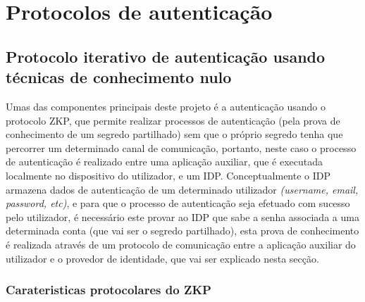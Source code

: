 \section{Protocolos de autenticação}

\subsection{Protocolo iterativo de autenticação usando técnicas de conhecimento nulo}

\quad Umas das componentes principais deste projeto é a autenticação usando o protocolo ZKP, que permite realizar processos de autenticação (pela prova de conhecimento de um segredo partilhado) sem que o próprio segredo tenha que percorrer um determinado canal de comunicação, portanto, neste caso o processo de autenticação é realizado entre uma aplicação auxiliar, que é executada localmente no dispositivo do utilizador, e um IDP. Conceptualmente o IDP armazena dados de autenticação de um determinado utilizador \textit{(username, email, password, etc)}, e para que o processo de autenticação seja efetuado com sucesso pelo utilizador, é necessário este provar ao IDP que sabe a senha associada a uma determinada conta (que vai ser o segredo partilhado), esta prova de conhecimento é realizada através de um protocolo de comunicação entre a aplicação auxiliar do utilizador e o provedor de identidade, que vai ser explicado nesta secção.

\subsubsection{Carateristicas protocolares do ZKP}

